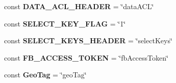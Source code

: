 \begin{DoxyCompactItemize}
\item 
\hypertarget{class_p_a_e___constants_a55c04959d64cbd3b973d208802933518}{const {\bfseries D\+A\+T\+A\+\_\+\+A\+C\+L\+\_\+\+H\+E\+A\+D\+E\+R} = \char`\"{}data\+A\+C\+L\char`\"{}}\label{class_p_a_e___constants_a55c04959d64cbd3b973d208802933518}

\item 
\hypertarget{class_p_a_e___constants_a3630f78abced80e008420528f29a45d5}{const {\bfseries S\+E\+L\+E\+C\+T\+\_\+\+K\+E\+Y\+\_\+\+F\+L\+A\+G} = \char`\"{}1\char`\"{}}\label{class_p_a_e___constants_a3630f78abced80e008420528f29a45d5}

\item 
\hypertarget{class_p_a_e___constants_a536461cfd75dd327d16d1caec6296c97}{const {\bfseries S\+E\+L\+E\+C\+T\+\_\+\+K\+E\+Y\+S\+\_\+\+H\+E\+A\+D\+E\+R} = \char`\"{}select\+Keys\char`\"{}}\label{class_p_a_e___constants_a536461cfd75dd327d16d1caec6296c97}

\item 
\hypertarget{class_p_a_e___constants_a751013c4ea0b65d21fa0b19a150bc9c4}{const {\bfseries F\+B\+\_\+\+A\+C\+C\+E\+S\+S\+\_\+\+T\+O\+K\+E\+N} = \char`\"{}fb\+Access\+Token\char`\"{}}\label{class_p_a_e___constants_a751013c4ea0b65d21fa0b19a150bc9c4}

\item 
\hypertarget{class_p_a_e___constants_ad9eeb2b96c34aef4a5b3a2c0defe5eac}{const {\bfseries Geo\+Tag} = \char`\"{}geo\+Tag\char`\"{}}\label{class_p_a_e___constants_ad9eeb2b96c34aef4a5b3a2c0defe5eac}

\end{DoxyCompactItemize}
